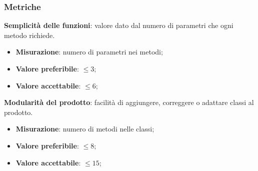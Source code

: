         \subsubsection{Metriche}
            \textbf{Semplicità delle funzioni}: valore dato dal numero di parametri che ogni metodo richiede.
                \begin{itemize}
                    \item \textbf{Misurazione}: numero di parametri nei metodi;
                    \item \textbf{Valore preferibile}: $\leq 3$;
                    \item \textbf{Valore accettabile}: $\leq 6$;
                \end{itemize}
            \textbf{Modularità del prodotto}: facilità di aggiungere, correggere o adattare classi al prodotto\glo.
                \begin{itemize}
                    \item \textbf{Misurazione}: numero di metodi nelle classi;
                    \item \textbf{Valore preferibile}: $\leq 8$;
                    \item \textbf{Valore accettabile}: $\leq 15$;
                \end{itemize}
